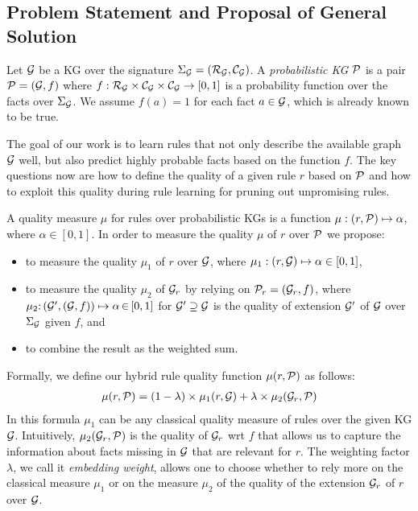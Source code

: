 \subsection{Problem Statement and Proposal of General Solution} 
Let $\mathcal{G}$ be a KG over the signature $\Sigma_{\mathcal{G}}=(\mathcal{R}_\mathcal{G},\mathcal{C}_\mathcal{G})$. 
A \emph{probabilistic KG} $\mathcal{P}$ is a pair $\mathcal{P} = (\mathcal{G},f)$ 
where $f:\mathcal{R}_\mathcal{G}\times \mathcal{C}_\mathcal{G} \times \mathcal{C}_\mathcal{G}\rightarrow [0,1]$ is a probability function over the facts over $\Sigma_{\mathcal{G}}$. We assume $f(a) = 1$ for each fact $a \in \mathcal{G}$, which is already known to be true.

The goal of our work is to learn rules that not only describe the available graph $\mathcal{G}$ well, but also predict highly probable facts based on the function $f$.
The key questions now are how to define the quality of a given rule $r$ based on $\mathcal{P}$ and how to exploit this quality during rule learning for pruning out unpromising rules. 



A quality measure $\mu$ for rules over probabilistic KGs 
is a function $\mu: (r,\mathcal{P}) \mapsto \alpha$, where $\alpha \in  [0,1]$.
In order to measure the quality $\mu$ of $r$ over $\mathcal{P}$ we propose: 
\begin{itemize}
\item to measure the quality $\mu_1$ of $r$ over $\mathcal{G}$, where $\mu_1: (r,\mathcal{G}) \mapsto \alpha \in  [0,1]$,
\item to measure the quality $\mu_2$ of $\mathcal{G}_r$ by relying on $\mathcal{P}_r=(\mathcal{G}_r,f)$, 
where $\mu_2{:}\, (\mathcal{G}'{,}\, (\mathcal{G},f)) \mapsto  \alpha \,{\in}\, [0,1]$ for $\mathcal{G}' \supseteq \mathcal{G}$ is the quality of extension $\mathcal{G}'$ of $\mathcal{G}$ over $\Sigma_\mathcal{G}$ given $f$, and 
\item to combine the result as the weighted sum.
\end{itemize}
Formally, we define our hybrid rule quality function $\mu(r,\mathcal{P})$ as follows:
\begin{align}\label{eq:hm}
	\mu(r,\mathcal{P})= (1 - \lambda)\times \mu_1(r,\mathcal{G}) + \lambda \times \mu_2(\mathcal{G}_r,\mathcal{P})
\end{align}
In this formula $\mu_1$ can be any classical quality measure of rules over the given KG $\mathcal{G}$. Intuitively, $\mu_2(\mathcal{G}_r,\mathcal{P})$ is the quality of $\mathcal{G}_r$ wrt $f$ that allows us to capture the information about facts missing in $\mathcal{G}$ that are relevant for $r$.
The weighting factor 
$\lambda$, we call it \textit{embedding weight}, allows one to choose whether 
to rely more on the classical measure $\mu_1$ or on the measure $\mu_2$ of the quality of the extension $\mathcal{G}_r$ of $r$ over $\mathcal{G}$.
